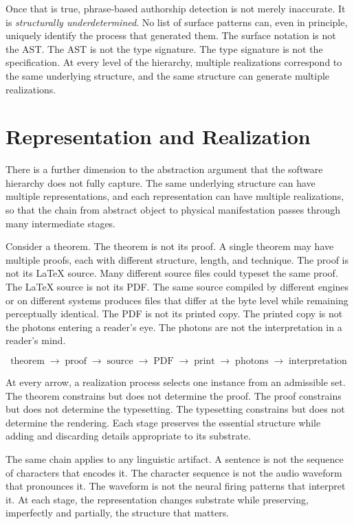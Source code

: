 \documentclass[12pt]{article}
\begin{document}
Once that is true, phrase-based authorship detection is not merely inaccurate. It is \emph{structurally underdetermined}. No list of surface patterns can, even in principle, uniquely identify the process that generated them. The surface notation is not the AST. The AST is not the type signature. The type signature is not the specification. At every level of the hierarchy, multiple realizations correspond to the same underlying structure, and the same structure can generate multiple realizations.

\section{Representation and Realization}

There is a further dimension to the abstraction argument that the software hierarchy does not fully capture. The same underlying structure can have multiple representations, and each representation can have multiple realizations, so that the chain from abstract object to physical manifestation passes through many intermediate stages.

Consider a theorem. The theorem is not its proof. A single theorem may have multiple proofs, each with different structure, length, and technique. The proof is not its \LaTeX{} source. Many different source files could typeset the same proof. The \LaTeX{} source is not its PDF. The same source compiled by different engines or on different systems produces files that differ at the byte level while remaining perceptually identical. The PDF is not its printed copy. The printed copy is not the photons entering a reader's eye. The photons are not the interpretation in a reader's mind.

\[
\text{theorem} \;\to\; \text{proof} \;\to\; \text{source} \;\to\; \text{PDF} \;\to\; \text{print} \;\to\; \text{photons} \;\to\; \text{interpretation}
\]

At every arrow, a realization process selects one instance from an admissible set. The theorem constrains but does not determine the proof. The proof constrains but does not determine the typesetting. The typesetting constrains but does not determine the rendering. Each stage preserves the essential structure while adding and discarding details appropriate to its substrate.

The same chain applies to any linguistic artifact. A sentence is not the sequence of characters that encodes it. The character sequence is not the audio waveform that pronounces it. The waveform is not the neural firing patterns that interpret it. At each stage, the representation changes substrate while preserving, imperfectly and partially, the structure that matters.
\end{document}
